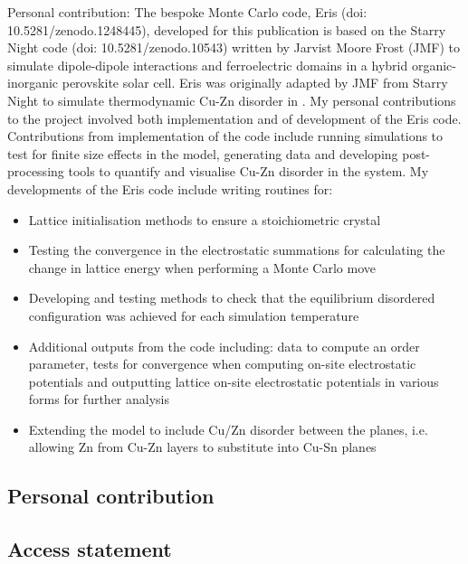 \documentclass[11pt, twoside]{report}
\begin{document}
Personal contribution: The bespoke Monte Carlo code, Eris (doi: 10.5281/zenodo.1248445), developed for this publication is based on the Starry Night code (doi: 10.5281/zenodo.10543) written by Jarvist Moore Frost (JMF) to simulate dipole-dipole interactions and ferroelectric domains in a hybrid organic-inorganic perovskite solar cell. Eris was originally adapted by JMF from Starry Night to simulate thermodynamic Cu-Zn disorder in {\CZTS}. My personal contributions to the project involved both implementation and of development of the Eris code. Contributions from implementation of the code include running simulations to test for finite size effects in the model, generating data and developing post-processing tools to quantify and visualise Cu-Zn disorder in the system. My developments of the Eris code include writing routines for:
\begin{itemize}
    \item Lattice initialisation methods to ensure a stoichiometric {\CZTS} crystal
    \item Testing the convergence in the electrostatic summations for calculating the change in lattice energy when performing a Monte Carlo move
    \item Developing and testing methods to check that the equilibrium disordered configuration was achieved for each simulation temperature
    \item Additional outputs from the code including: data to compute an order parameter, tests for convergence when computing on-site electrostatic potentials and outputting lattice on-site electrostatic potentials in various forms for further analysis
    \item Extending the model to include Cu/Zn disorder between the planes, i.e. allowing Zn from Cu-Zn layers to substitute into Cu-Sn planes
\end{itemize}




\subsection{Personal contribution}
\subsection{Access statement}


\end{document}
